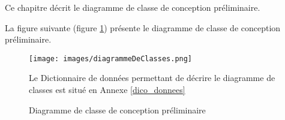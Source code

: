 Ce chapitre décrit le diagramme de classe de conception préliminaire.

La figure suivante (figure \ref{diagrammeClasse}) présente le diagramme de classe de conception préliminaire.
\begin{figure}[H]
	\centering
	\texttt{[image: images/diagrammeDeClasses.png]}
	\caption{Diagramme de classe de conception préliminaire}
	\label{diagrammeClasse}
	Le Dictionnaire de données permettant de décrire le diagramme de classes est situé en Annexe \ref{dico_donnees} 
\end{figure}
